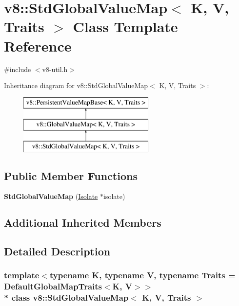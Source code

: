 \hypertarget{classv8_1_1StdGlobalValueMap}{}\section{v8\+:\+:Std\+Global\+Value\+Map$<$ K, V, Traits $>$ Class Template Reference}
\label{classv8_1_1StdGlobalValueMap}


{\ttfamily \#include $<$v8-\/util.\+h$>$}

Inheritance diagram for v8\+:\+:Std\+Global\+Value\+Map$<$ K, V, Traits $>$\+:\begin{figure}[H]
\begin{center}
\leavevmode
\includegraphics[height=3.000000cm]{classv8_1_1StdGlobalValueMap}
\end{center}
\end{figure}
\subsection*{Public Member Functions}
\begin{DoxyCompactItemize}
\item 
{\bfseries Std\+Global\+Value\+Map} (\hyperlink{classv8_1_1Isolate}{Isolate} $\ast$isolate)\hypertarget{classv8_1_1StdGlobalValueMap_af1025915a269b8b37af93ffc2ad5c3b1}{}\label{classv8_1_1StdGlobalValueMap_af1025915a269b8b37af93ffc2ad5c3b1}

\end{DoxyCompactItemize}
\subsection*{Additional Inherited Members}


\subsection{Detailed Description}
\subsubsection*{template$<$typename K, typename V, typename Traits = Default\+Global\+Map\+Traits$<$\+K, V$>$$>$\\*
class v8\+::\+Std\+Global\+Value\+Map$<$ K, V, Traits $>$}

